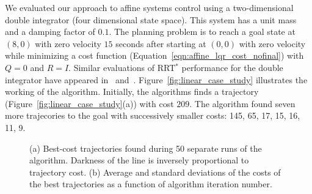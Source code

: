 \documentclass[letterpaper, 10pt, english, conference]{IEEEtran}
\begin{document}
We evaluated our approach to affine systems control using a
two-dimensional double integrator (four dimensional state space). This
system has a unit mass and a damping factor of $0.1$. The planning
problem is to reach a goal state at $(8,0)$ with zero velocity $15$
seconds after starting at $(0,0)$ with zero velocity while minimizing
a cost function (Equation~\ref{eqn:affine_lqr_cost_nofinal}) with
$Q=0$ and $R=I$. Similar evaluations of RRT$^*$ performance for the
double integrator have appeared in~\cite{Karaman.Frazzoli:CDC10}
and~\cite{jur}. Figure~\ref{fig:linear_case_study} illustrates the
working of the algorithm. Initially, the algorithms finds a trajectory
(Figure~\ref{fig:linear_case_study}(a)) with cost $209$. The algorithm
found seven more trajecories to the goal with successively smaller
costs: 145, 65, 17, 15, 16, 11, 9.

\begin{figure}
\begin{center}
  \begin{center}
  \end{center}
\end{center}
\caption{(a) Best-cost trajectories found during 50 separate runs of
  the algorithm. Darkness of the line is inversely proportional to
  trajectory cost. (b) Average and standard deviations of the costs of
  the best trajectories as a function of algorithm iteration number.}
\label{fig:linear_case_study2}
\end{figure}
\end{document}
